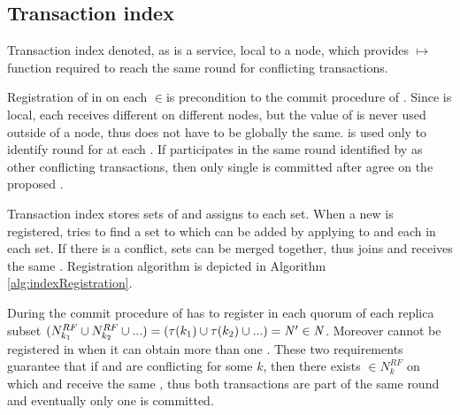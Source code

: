 
\subsection{Transaction index}
\label{sec:mpp:txIndex}
Transaction index denoted, as \txIndex is a service, local to a node, which provides \mbox{\txState $\mapsto $ \paxosRoundId} function required to reach the same \paxos round for conflicting transactions.

Registration of \txState in \txIndex on each  $\in$\nodesTx is precondition to the commit procedure of \mpt. 
Since \txIndex is local, each \transaction receives different \paxosRoundId on different nodes, but the value of \paxosRoundId is never used outside of a node, thus \paxosRoundId does not have to be globally the same. \paxosRoundId is used only to identify \paxos round for \conflictingTxSet at each . If \transaction participates in the same \paxos round identified by \paxosRoundId as other conflicting transactions, then only single \transaction is committed after \nodesTx agree on the proposed \txState.



Transaction index stores sets of \conflictingTxSet and assigns \paxosRoundId to each set. When a new \txStateM is registered, \txIndex tries to find a set \conflictingTxSet to which \txStateM can be added by applying \conflictFunction to \txStateM and each \transaction in each set. If there is a conflict, sets can be merged together, thus \txStateM joins \conflictingTxSet and receives the same \paxosRoundId. Registration algorithm is depicted in Algorithm \ref{alg:indexRegistration}.

During the commit procedure of \mpt \transactionFull has to register in each quorum of each replica subset
$(N^{RF}_{k_1} \cup N^{RF}_{k_2} \cup ... ) =
(\tau(k_1) \cup \tau(k_2) \cup ... ) = 
 \text{$\mathit{N'}$}\in\mathit{N}$.
Moreover \transaction cannot be registered in \txIndex when it can obtain more than one \paxosRoundId. These two requirements guarantee that if \txOne and \txTwo are conflicting for some $k$, then there exists 
$\in N^{RF}_{k}$ on which \txOne and \txTwo receive the same \paxosRoundId, thus both transactions are part of the same \paxos round and eventually only one is committed.

